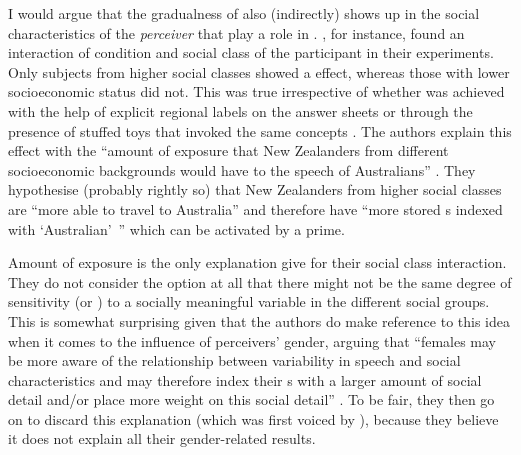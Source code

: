 I would argue that the gradualness of  also (indirectly) shows up in the social characteristics of the \emph{perceiver} that play a role in .
\textcite{hayetal2006a,haydrager2010}, for instance, found an interaction of  condition and social class of the participant in their experiments.
Only subjects from higher social classes showed a  effect, whereas those with lower socioeconomic status did not.
This was true irrespective of whether  was achieved with the help of explicit regional labels on the answer sheets or through the presence of stuffed toys that invoked the same concepts \parencite[cf.][878]{haydrager2010}.
The authors explain this effect with the ``amount of exposure  that New Zealanders from different socioeconomic backgrounds would have to the speech of Australians'' \parencite[878]{haydrager2010}.
They hypothesise (probably rightly so) that New Zealanders from higher social classes are ``more able to travel to Australia'' and therefore have ``more stored s indexed with `Australian'~'' which can be activated by a prime.

Amount of exposure is the only explanation \citeauthor{haydrager2010} give for their social class interaction.
They do not consider the option at all that there might not be the same degree of sensitivity (or ) to a socially meaningful variable in the different social groups.
This is somewhat surprising given that the authors do make reference to this idea when it comes to the influence of perceivers' gender, arguing that ``females may be more aware of the relationship between variability in speech and social characteristics and may therefore index their s with a larger amount of social detail and/or place more weight on this social detail'' \parencite[884]{haydrager2010}.
To be fair, they then go on to discard this explanation (which was first voiced by \cite{drager2005}), because they believe it does not explain all their gender-related results.

